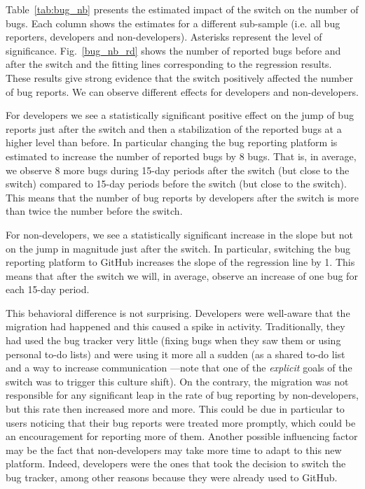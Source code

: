 \documentclass[runningheads]{llncs}
\begin{document}
Table~\ref{tab:bug_nb} presents the estimated impact of the switch on the number of bugs. Each column shows the estimates for a different sub-sample (i.e. all bug reporters, developers and non-developers). Asterisks represent the level of significance.  Fig.~\ref{bug_nb_rd}  shows the number of reported bugs before and after the switch and the fitting lines corresponding to the regression results. These results give strong evidence that the switch positively affected  the number of bug reports. We can observe different effects for developers and non-developers. 

For developers we see a statistically significant positive effect on the jump of bug reports just after the switch and then a stabilization of the reported bugs at a higher level than before.
In particular changing the bug reporting platform is estimated to increase the number of reported bugs by 8 bugs. That is, in average, we observe 8 more bugs during 15-day periods after the switch (but close to the switch) compared to 15-day periods before the switch (but close to the switch). This means that the number of bug reports by developers after the switch is more than twice the number before the switch.

For non-developers, we see a statistically significant increase in the slope but not on the jump in magnitude just after the switch.
In particular, switching the bug reporting platform to GitHub increases the slope of the regression line by 1. This means that after the switch we will, in average, observe an increase of one bug for each 15-day period.

This behavioral difference is not surprising. Developers were well-aware that the migration had happened and this caused a spike in activity. Traditionally, they had used the bug tracker very little (fixing bugs when they saw them or using personal to-do lists) and were using it more all a sudden (as a shared to-do list and a way to increase communication ---note that one of the \emph{explicit} goals of the switch was to trigger this culture shift). On the contrary, the migration was not responsible for any significant leap in the rate of bug reporting by non-developers, but this rate then increased more and more. This could be due in particular to users noticing that their bug reports were treated more promptly, which could be an encouragement for reporting more of them. Another possible influencing factor may be the fact that non-developers may take more time to adapt to this new platform. Indeed, developers were the ones that took the decision to switch the bug tracker, among other reasons because they were already used to GitHub. 
\end{document}
